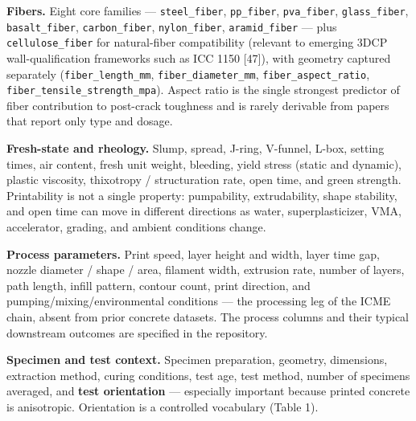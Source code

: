 \documentclass[
  11pt,
  letterpaper,
]{article}
\begin{document}
\textbf{Fibers.} Eight core families --- \texttt{steel\_fiber},
\texttt{pp\_fiber}, \texttt{pva\_fiber}, \texttt{glass\_fiber},
\texttt{basalt\_fiber}, \texttt{carbon\_fiber}, \texttt{nylon\_fiber},
\texttt{aramid\_fiber} --- plus \texttt{cellulose\_fiber} for
natural-fiber compatibility (relevant to emerging 3DCP
wall-qualification frameworks such as ICC 1150 {[}47{]}), with geometry
captured separately (\texttt{fiber\_length\_mm},
\texttt{fiber\_diameter\_mm}, \texttt{fiber\_aspect\_ratio},
\texttt{fiber\_tensile\_strength\_mpa}). Aspect ratio is the single
strongest predictor of fiber contribution to post-crack toughness and is
rarely derivable from papers that report only type and dosage.

\textbf{Fresh-state and rheology.} Slump, spread, J-ring, V-funnel,
L-box, setting times, air content, fresh unit weight, bleeding, yield
stress (static and dynamic), plastic viscosity, thixotropy /
structuration rate, open time, and green strength. Printability is not a
single property: pumpability, extrudability, shape stability, and open
time can move in different directions as water, superplasticizer, VMA,
accelerator, grading, and ambient conditions change.

\textbf{Process parameters.} Print speed, layer height and width, layer
time gap, nozzle diameter / shape / area, filament width, extrusion
rate, number of layers, path length, infill pattern, contour count,
print direction, and pumping/mixing/environmental conditions --- the
processing leg of the ICME chain, absent from prior concrete datasets.
The process columns and their typical downstream outcomes are specified
in the repository.

\textbf{Specimen and test context.} Specimen preparation, geometry,
dimensions, extraction method, curing conditions, test age, test method,
number of specimens averaged, and \textbf{test orientation} ---
especially important because printed concrete is anisotropic.
Orientation is a controlled vocabulary (Table 1).
\end{document}
